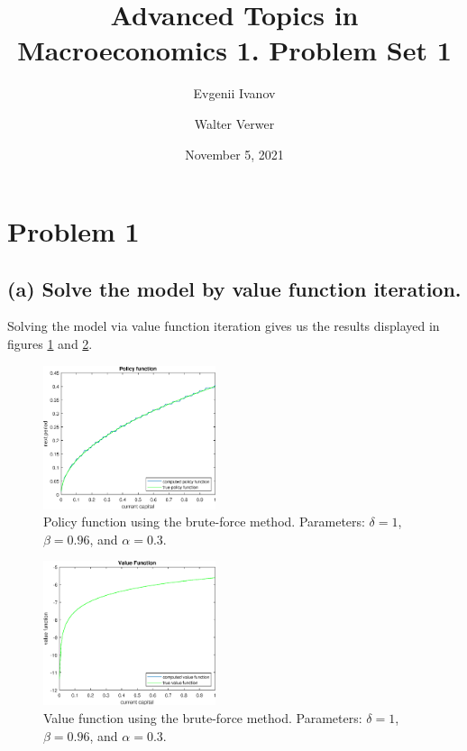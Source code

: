 \documentclass[12pt]{article}
\newcommand{\?}{\stackrel{?}{=}}
\begin{document}
\title{\vspace{-1.5cm} Advanced Topics in Macroeconomics 1. Problem Set 1}
\author{Evgenii Ivanov \and Walter Verwer}
\date{November 5, 2021}
 
\maketitle

\section*{Problem 1}

\subsection*{(a) Solve the model by value function iteration.}
Solving the model via value function iteration gives us the results displayed in figures \ref{fig:pol} and \ref{fig:val}.
\begin{figure}[htbp!]
    \centering
    \includegraphics[width=0.45\textwidth]{PS1/1_Policy_Function_without.eps}
    \caption{Policy function using the brute-force method. Parameters: $\delta=1$, $\beta=0.96$, and $\alpha=0.3$.}
    \label{fig:pol}
\end{figure}

\begin{figure}[htbp!]
    \centering
    \includegraphics[width=0.45\textwidth]{PS1/1_Value_function_without.eps}
    \caption{Value function using the brute-force method. Parameters: $\delta=1$, $\beta=0.96$, and $\alpha=0.3$.}
    \label{fig:val}
\end{figure}
\end{document}
